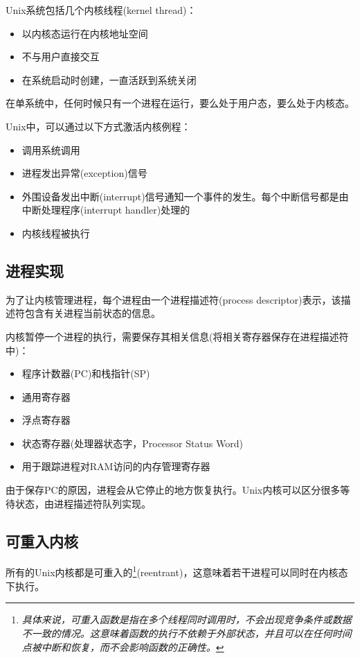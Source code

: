     Unix系统包括几个内核线程(kernel thread)：

\begin{itemize}
    \item 以内核态运行在内核地址空间
    \item 不与用户直接交互
    \item 在系统启动时创建，一直活跃到系统关闭
\end{itemize}

    在单系统中，任何时候只有一个进程在运行，要么处于用户态，要么处于内核态。

    Unix中，可以通过以下方式激活内核例程：

\begin{itemize}
    \item 调用系统调用
    \item 进程发出异常(exception)信号
    \item 外围设备发出中断(interrupt)信号通知一个事件的发生。每个中断信号都是由中断处理程序(interrupt handler)处理的
    \item 内核线程被执行
\end{itemize}

\subsection{进程实现}

    为了让内核管理进程，每个进程由一个进程描述符(process descriptor)表示，该描述符包含有关进程当前状态的信息。

    内核暂停一个进程的执行，需要保存其相关信息(将相关寄存器保存在进程描述符中)：

\begin{itemize}
    \item 程序计数器(PC)和栈指针(SP)
    \item 通用寄存器
    \item 浮点寄存器
    \item 状态寄存器(处理器状态字，Processor Status Word)
    \item 用于跟踪进程对RAM访问的内存管理寄存器
\end{itemize}

    由于保存PC的原因，进程会从它停止的地方恢复执行。Unix内核可以区分很多等待状态，由进程描述符队列实现。

\subsection{可重入内核}

    所有的Unix内核都是可重入的\footnote[1]{\emph{具体来说，可重入函数是指在多个线程同时调用时，不会出现竞争条件或数据不一致的情况。这意味着函数的执行不依赖于外部状态，并且可以在任何时间点被中断和恢复，而不会影响函数的正确性。}}(reentrant)，这意味着若干进程可以同时在内核态下执行。

